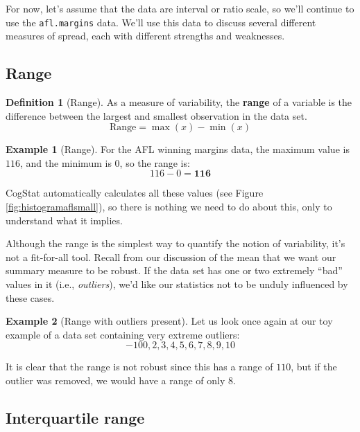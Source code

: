 \documentclass[
]{book}
\theoremstyle{definition}
\newtheorem{definition}{Definition}[chapter]
\theoremstyle{definition}
\newtheorem{example}{Example}[chapter]
\theoremstyle{definition}
\theoremstyle{definition}
\theoremstyle{remark}
\begin{document}
For now, let's assume that the data are interval or ratio scale, so we'll continue to use the \texttt{afl.margins} data. We'll use this data to discuss several different measures of spread, each with different strengths and weaknesses.

\hypertarget{range}{%
\subsection{Range}\label{range}}

\begin{definition}[Range]
\protect\hypertarget{def:defrange}{}\label{def:defrange}As a measure of variability, the \textbf{range} of a variable is the difference between the largest and smallest observation in the data set.
\[
\text{Range}=\max(x)-\min(x)
\]
\end{definition}

\begin{example}[Range]
\protect\hypertarget{exm:exrange}{}\label{exm:exrange}For the AFL winning margins data, the maximum value is \(116\), and the minimum is \(0\), so the range is:
\[116-0=\mathbf{116}\]
\end{example}

CogStat automatically calculates all these values (see Figure \ref{fig:histogramaflsmall}), so there is nothing we need to do about this, only to understand what it implies.

Although the range is the simplest way to quantify the notion of variability, it's not a fit-for-all tool. Recall from our discussion of the mean that we want our summary measure to be robust. If the data set has one or two extremely ``bad'' values in it (i.e., \emph{outliers}), we'd like our statistics not to be unduly influenced by these cases.

\begin{example}[Range with outliers present]
\protect\hypertarget{exm:exrange2}{}\label{exm:exrange2}Let us look once again at our toy example of a data set containing very extreme outliers:
\[
-100,2,3,4,5,6,7,8,9,10
\]

It is clear that the range is not robust since this has a range of \(110\), but if the outlier was removed, we would have a range of only \(8\).
\end{example}

\hypertarget{IQR}{%
\subsection{Interquartile range}\label{IQR}}
\end{document}
